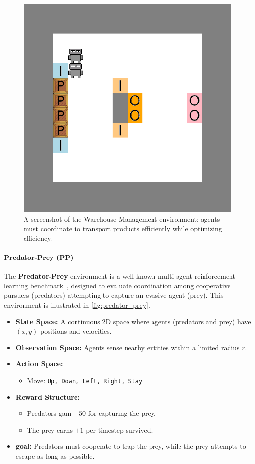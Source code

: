\documentclass[pdflatex,sn-mathphys-num]{sn-jnl}%
\theoremstyle{thmstyleone}%
\theoremstyle{thmstyletwo}%
\theoremstyle{thmstylethree}%
\begin{document}
\begin{figure}[h!]
  \centering
  \includegraphics[width=0.7\linewidth]{figures/wm.png}
  \caption{A screenshot of the Warehouse Management environment: agents must coordinate to transport products efficiently while optimizing efficiency.}
  \label{fig:warehouse}
\end{figure}

\paragraph{Predator-Prey (PP)}
The \textbf{Predator-Prey} environment is a well-known multi-agent reinforcement learning benchmark~\cite{lowe2017multi}, designed to evaluate coordination among cooperative pursuers (predators) attempting to capture an evasive agent (prey). This environment is illustrated in \autoref{fig:predator_prey}.

\begin{itemize}
    \item \textbf{State Space:} A continuous 2D space where agents (predators and prey) have $(x, y)$ positions and velocities.
    \item \textbf{Observation Space:} Agents sense nearby entities within a limited radius $r$.
    \item \textbf{Action Space:} 
    \begin{itemize}
        \item Move: \texttt{Up, Down, Left, Right, Stay}
    \end{itemize}
    \item \textbf{Reward Structure:}
    \begin{itemize}
        \item Predators gain $+50$ for capturing the prey.
        \item The prey earns $+1$ per timestep survived.
    \end{itemize}
    \item \textbf{goal:} Predators must cooperate to trap the prey, while the prey attempts to escape as long as possible.
\end{itemize}
\end{document}
